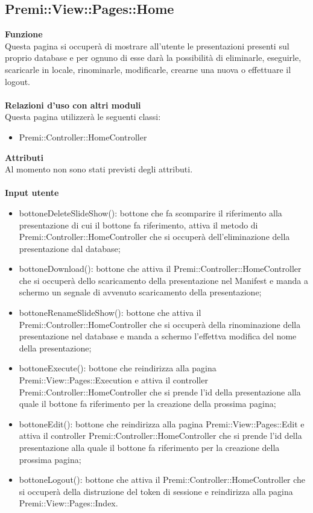 {				\subsection{Premi::View::Pages::Home}{
						\textbf{Funzione}\\
						\indent Questa pagina si occuperà di mostrare all'utente le presentazioni presenti sul proprio database e per ognuno di esse darà la possibilità di eliminarle, eseguirle, scaricarle in locale, rinominarle, modificarle, crearne una nuova o effettuare il logout.\\\\
						\textbf{Relazioni d'uso con altri moduli}\\
						\indent Questa pagina utilizzerà le seguenti classi:
						\begin{itemize}
							\item Premi::Controller::HomeController
						\end{itemize}
						\textbf{Attributi}\\
						\indent Al momento non sono stati previsti degli attributi.\\\\
						\textbf{Input utente}
						\begin{itemize}
							\item bottoneDeleteSlideShow(): bottone che fa scomparire il riferimento alla presentazione di cui il bottone fa riferimento, attiva il metodo di Premi::Controller::HomeController che si occuperà dell'eliminazione della presentazione dal database;
							\item bottoneDownload(): bottone che attiva il Premi::Controller::HomeController che si occuperà dello scaricamento della presentazione nel Manifest e manda a schermo un segnale di avvenuto scaricamento della presentazione;
							\item bottoneRenameSlideShow(): bottone che attiva il Premi::Controller::HomeController che si occuperà della rinominazione della presentazione nel database e manda a schermo l'effettva modifica del nome della presentazione;
							\item bottoneExecute(): bottone che reindirizza alla pagina Premi::View::Pages::Execution e attiva il controller Premi::Controller::HomeController che si prende l'id della presentazione alla quale il bottone fa riferimento per la creazione della prossima pagina;
							\item bottoneEdit(): bottone che reindirizza alla pagina Premi::View::Pages::Edit e attiva il controller Premi::Controller::HomeController che si prende l'id della presentazione alla quale il bottone fa riferimento per la creazione della prossima pagina;
							\item bottoneLogout(): bottone che attiva il Premi::Controller::HomeController che si occuperà della distruzione del token di sessione e reindirizza alla pagina Premi::View::Pages::Index.
						\end{itemize}
					}
}
